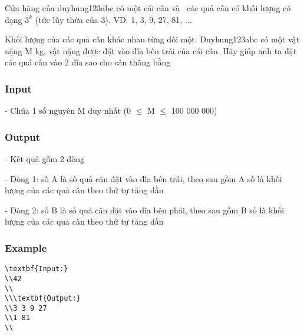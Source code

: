 



   Cửa hàng của duyhung123abc có một cái cân và  các quả cân có khối lượng có dạng $3^{k}$   (tức lũy thừa của 3). VD: 1, 3, 9, 27, 81, ...  

   Khối lượng của các quả cân khác nhau từng đôi một. Duyhung123abc có một vật nặng M kg, vật nặng được đặt vào đĩa bên trái của cái cân. Hãy giúp anh ta đặt các quả cân vào 2 đĩa sao cho cân thãng bằng  

\subsubsection{   Input  }

   - Chứa 1 số nguyên M duy nhất (0  $\le$  M  $\le$  100 000 000)  

\subsubsection{   Output  }

   - Kết quả gồm 2 dòng  

   - Dòng 1: số A là số quả cân đặt vào đĩa bên trái, theo sau gồm A số là khối lượng của các quả cân theo thứ tự tăng dần  

   - Dòng 2: số B là số quả cân đặt vào đĩa bên phải, theo sau gồm B số là khối lượng của các quả cân theo thứ tự tăng dần  

\subsubsection{   Example  }
\begin{verbatim}
\textbf{Input:}
\\42
\\
\\\textbf{Output:}
\\3 3 9 27
\\1 81
\\\end{verbatim}
